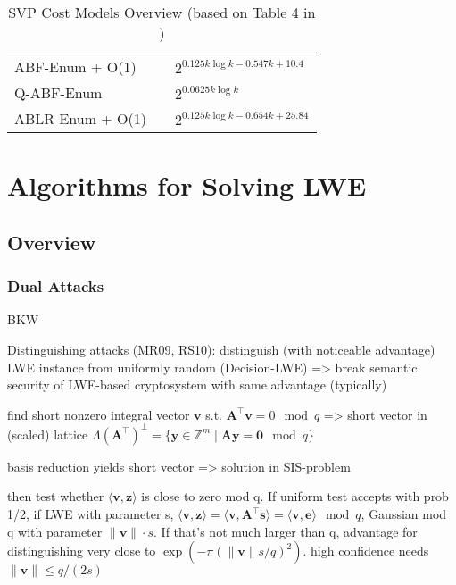 \begin{table}
\begin{tabular}{lll}
    ABF-Enum + O(1)                  & \cite{ABFKSW20}                 & $2^{0.125k \log k - 0.547k + 10.4}$   \\
    Q-ABF-Enum                       & \cite{ABFKSW20}                 & $2^{0.0625 k \log k}$                 \\
    ABLR-Enum + O(1)                 & \cite{ABLR21}                   & $2^{0.125k \log k - 0.654k + 25.84}$  \\
    \bottomrule
  \end{tabular}
  \caption{SVP Cost Models Overview (based on Table 4 in \cite{ACDDPPVW18})} %
  \label{tab:costmodels}
\end{table} %










\section{Algorithms for Solving LWE}
\subsection{Overview}

\subsubsection{Dual Attacks}
BKW



Distinguishing attacks (MR09, RS10): distinguish (with noticeable advantage) LWE instance from uniformly random (Decision-LWE) => break semantic security of LWE-based cryptosystem with same advantage (typically)

find short nonzero integral vector $\mathbf{v}$ s.t. $\mathbf{A}^\intercal \mathbf{v} = 0 \mod q$ => short vector in (scaled) lattice $\Lambda(\mathbf{A}^\intercal)^{\perp} = \{ \mathbf{y} \in \mathbb{Z}^m \mid \mathbf{A} \mathbf{y} = \mathbf{0} \mod q\}$ %

basis reduction yields short vector => solution in SIS-problem

then test whether $\langle \mathbf{v}, \mathbf{z} \rangle$ is close to zero mod q. If uniform test accepts with prob 1/2, if LWE with parameter s, $\langle \mathbf{v}, \mathbf{z} \rangle = \langle \mathbf{v}, \mathbf{A}^\intercal \mathbf{s} \rangle = \langle \mathbf{v}, \mathbf{e} \rangle \mod q$, Gaussian mod q with parameter $\| \mathbf{v} \| \cdot s$. If that's not much larger than q, advantage for distinguishing very close to $\exp(-\pi (\| \mathbf{v} \| s/q)^2)$. high confidence needs $\| \mathbf{v} \| \leq q/(2s)$

